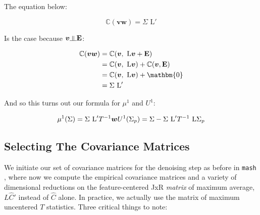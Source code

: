 \documentclass[11pt, oneside]{article}   	%
\newcommand{\indep}{\rotatebox[origin=c]{90}{$\models$}}
\newcommand{\Cov}{\mathbb{C}} %
\newcommand{\wfit}{\bm{w}}
\newcommand{\vb}{\bm{v}}
\def\lstar{\text{ L}}
\def\mash{{\tt mash }}
\begin{document}
{The equation below: 

\begin{equation}
 \Cov(\vb \wfit ) = \Sigma \lstar'
 \end{equation}
 
 Is the case because  $\vb \indep \mathbf{E}$:

\begin{center}
\begin{equation}
\begin{aligned}
\Cov(\vb \wfit ) &=  \Cov(\vb , \lstar \vb  + \mathbf{E}) \\
&= \Cov(\vb , \lstar \vb ) +\Cov(\vb , \mathbf{E}) \\
&= \Cov(\vb , \lstar \vb ) + \mathbm{0} \\
&= \Sigma \lstar' \\
\end{aligned} 
\end{equation}
\end{center}


And so this turns out our formula for $\mu^{1}$ and $U^{1}$:

\begin{center}
\begin{equation}
\mu^{1} ( \Sigma ) = \Sigma \lstar ' T^{-1} \wfit  \\
U^{1} ( \Sigma_p ) = \Sigma - \Sigma \lstar ' T^{-1} \lstar  \Sigma_{p}\\
\end{equation}
\end{center}

\subsection{Selecting The Covariance Matrices}

We initiate our set of covariance matrices for the denoising step as before in \mash{}, where now we compute the empirical covariance matrices and a variety of dimensional reductions on the feature-centered JxR \textit{matrix} of maximum average, $L \hat{C}' $ instead of $\hat{C}$ alone. In practice, we actually use the matrix of maximum uncentered $T$ statistics. Three critical things to note:

}
\end{document}
